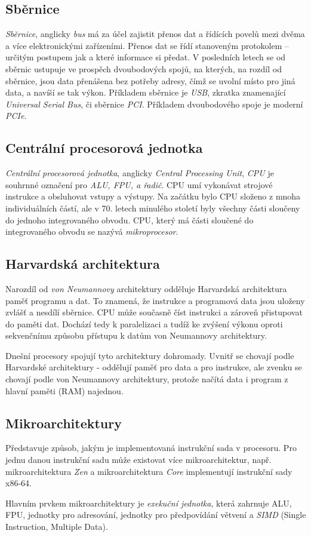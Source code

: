 \documentclass[a4paper]{article}
\begin{document}
    \subsection{Sběrnice}
        \textit{Sběrnice}, anglicky \textit{bus} má za účel zajistit přenos dat a řídících povelů mezi dvěma a více elektronickými zařízeními. Přenos dat se řídí stanoveným protokolem -- určitým postupem jak a které informace si předat. V posledních letech se od sběrnic ustupuje ve prospěch dvoubodových spojů, na kterých, na rozdíl od sběrnice, jsou data přenášena bez potřeby adresy, čímž se uvolní místo pro jiná data, a navíší se tak výkon. Příkladem sběrnice je \textit{USB}, zkratka znamenající \textit{Universal Serial Bus}, či sběrnice \textit{PCI}. Příkladem dvoubodového spoje je moderní \textit{PCIe}.
    \subsection{Centrální procesorová jednotka}
        \textit{Centrální procesorová jednotka}, anglicky \textit{Central Processing Unit}, \textit{CPU} je souhrnné označení pro \textit{ALU, FPU, a řadič}. CPU umí vykonávat strojové instrukce a obsluhovat vstupy a výstupy. Na začátku bylo CPU složeno z mnoha individuálních částí, ale v 70. letech minulého století byly všechny části sloučeny do jednoho integrovaného obvodu. CPU, který má části sloučené do integrovaného obvodu se nazývá \textit{mikroprocesor}.
    \subsection{Harvardská architektura}
        Narozdíl od \textit{von Neumannovy} architektury odděluje Harvardská architektura paměť programu a dat. To znamená, že instrukce a programová data jsou uloženy zvlášť a nesdílí sběrnice. CPU může současně číst instrukci a zároveň přistupovat do paměti dat. Dochází tedy k paralelizaci a tudíž ke zvýšení výkonu oproti sekvenčnímu způsobu přístupu k datům von Neumannovy architektury.
        \par
        Dnešní procesory spojují tyto architektury dohromady. Uvnitř se chovají podle Harvardské architektury - oddělují paměť pro data a pro instrukce, ale zvenku se chovají podle von Neumannovy architektury, protože načítá data i program z hlavní paměti (RAM) najednou.
    \subsection{Mikroarchitektury}
        Představuje způsob, jakým je implementovaná instrukční sada v procesoru. Pro jednu danou instrukční sadu může existovat více mikroarchitektur, např. mikroarchitektura \textit{Zen} a mikroarchitektura \textit{Core} implementují instrukční sady x86-64.
        \par
        Hlavním prvkem mikroarchitektury je \textit{exekuční jednotka}, která zahrnuje ALU, FPU, jednotky pro adresování, jednotky pro předpovídání větvení a \textit{SIMD} (Single Instruction, Multiple Data).
\end{document}

